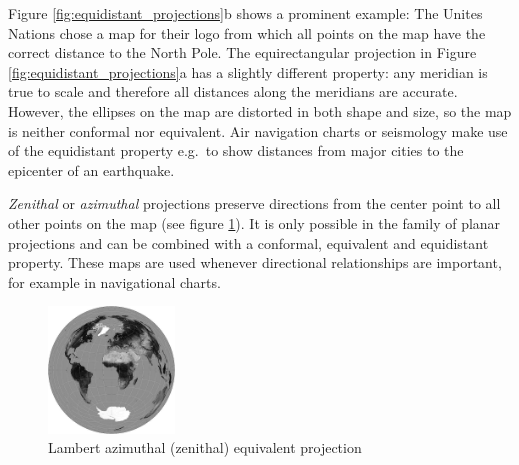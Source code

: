 \addtocounter{footnote}{1} %


Figure \ref{fig:equidistant_projections}b shows a prominent example: The Unites Nations chose a map for their logo from which all points on the map have the correct distance to the North Pole. The equirectangular projection in Figure \ref{fig:equidistant_projections}a has a slightly different property: any meridian is true to scale and therefore all distances along the meridians are accurate. However, the ellipses on the map are distorted in both shape and size, so the map is neither conformal nor equivalent. Air navigation charts or seismology make use of the equidistant property e.g.\ to show distances from major cities to the epicenter of an earthquake.
\cite{mapProjectionGeokov}

\emph{Zenithal} or \emph{azimuthal} projections preserve directions from the center point to all other points on the map (see figure \ref{fig:zenithal_projection}). It is only possible in the family of planar projections and can be combined with a conformal, equivalent and equidistant property. These maps are used whenever directional relationships are important, for example in navigational charts.

\begin{figure}[ht]
  \centering
  \includegraphics[width=0.3\textwidth]{graphics/basics/projection_distortion_azimuthal.png}
  \caption{Lambert azimuthal (zenithal) equivalent projection \protect\footnotemark}
  \label{fig:zenithal_projection}
\end{figure}


